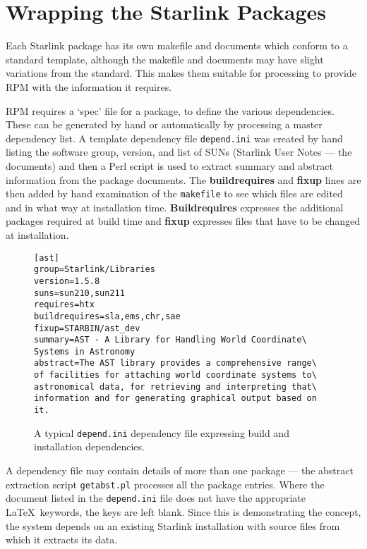 \section{Wrapping the Starlink Packages}

Each Starlink package has its own makefile and documents which conform
to a standard template, although the makefile and documents may have
slight variations from the standard.  This makes them suitable for
processing to provide RPM with the information it requires.

RPM requires a `spec' file for a package, to define the various
dependencies.  These can be generated by hand or automatically by
processing a master dependency list.    A template dependency file
{\tt{depend.ini}} was created by hand listing the software group,
version, and list of SUNs (Starlink User Notes --- the documents) and
then a Perl script is used to extract summary and abstract information
from the package documents.  The {\bf{buildrequires}} and {\bf{fixup}}
lines are then added by hand examination of the {\tt{makefile}} to see
which files are edited and in what way at installation time.
{\bf{Buildrequires}} expresses the additional packages required at
build time and {\bf{fixup}} expresses files that have to be changed at
installation.

\begin{figure}
\begin{verbatim}
[ast]
group=Starlink/Libraries 
version=1.5.8 
suns=sun210,sun211 
requires=htx
buildrequires=sla,ems,chr,sae 
fixup=STARBIN/ast_dev 
summary=AST - A Library for Handling World Coordinate\
Systems in Astronomy 
abstract=The AST library provides a comprehensive range\
of facilities for attaching world coordinate systems to\
astronomical data, for retrieving and interpreting that\
information and for generating graphical output based on it.
\end{verbatim}
\caption{A typical {\tt{depend.ini}} dependency file expressing 
build and installation dependencies.}
\end{figure}

A dependency file may contain details of more than one package --- the
abstract extraction script {\tt{getabst.pl}} processes all the package
entries.  Where the document listed in the {\tt{depend.ini}} file does not have
the appropriate \LaTeX\ keywords, the keys are left blank.  Since this is 
demonstrating the concept, the system depends on an existing Starlink
installation with source files from which it extracts its data.

